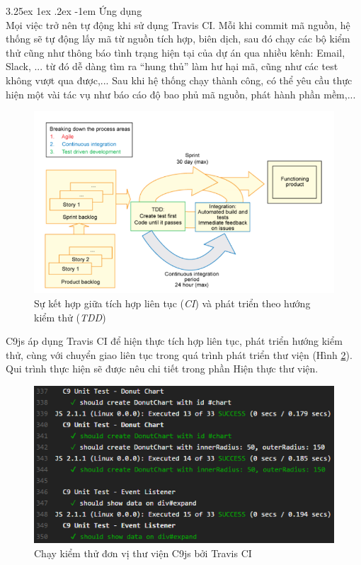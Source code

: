 \documentclass[12pt,a4paper]{article}
\makeatletter
\newcommand*\NewPage{\newpage\null\thispagestyle{empty}\newpage}
\newcommand{\myparagraph}[1]{\paragraph{#1}\mbox{}\\} %
\renewcommand\paragraph{\@startsection{paragraph}{5}{\z@}%
  {3.25ex \@plus1ex \@minus.2ex}%
  {-1em}%
  {\normalfont\normalsize\bfseries}}
\makeatother
\begin{document}
\myparagraph{Ứng dụng}
Mọi việc trở nên tự động khi sử dụng Travis CI. Mỗi khi commit mã nguồn, hệ thống sẽ tự động lấy mã từ nguồn tích hợp, biên dịch, sau đó chạy các bộ kiểm thử cũng như thông báo tình trạng hiện tại của dự án qua nhiều kênh: Email, Slack, ... từ đó dễ dàng tìm ra “hung thủ” làm hư hại mã, cũng như các test không vượt qua được,... Sau khi hệ thống chạy thành công, có thể yêu cầu thực hiện một vài tác vụ như báo cáo độ bao phủ mã nguồn, phát hành phần mềm,...

\begin{figure}[!h]
	\begin{center}
    \includegraphics[scale=0.9]{image/ci_cd}
    \caption{Sự kết hợp giữa tích hợp liên tục (\textit{CI}) và phát triển theo hướng kiểm thử (\textit{TDD})}
    \label{fig:ci_cd}
	\end{center}
\end{figure}

C9js áp dụng Travis CI để hiện thực tích hợp liên tục, phát triển hướng kiểm thử, cùng với chuyển giao liên tục trong quá trình phát triển thư viện (Hình \ref{fig:ci_c9}). Qui trình thực hiện sẽ được nêu chi tiết trong phần Hiện thực thư viện.

\begin{figure}[!h]
	\begin{center}
    \includegraphics[scale=1]{image/ci_c9}
    \caption{Chạy kiểm thử đơn vị thư viện C9js bởi Travis CI}
    \label{fig:ci_c9}
	\end{center}
\end{figure}
\clearpage
\NewPage
\end{document}
